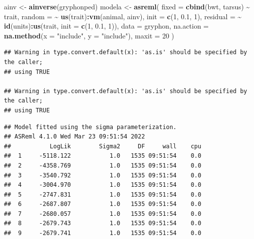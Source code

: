 \documentclass[
  12pt,
]{book}
\newenvironment{Shaded}{\begin{snugshade}}{\end{snugshade}}
\newcommand{\DataTypeTok}[1]{\textcolor[rgb]{0.13,0.29,0.53}{#1}}
\newcommand{\DecValTok}[1]{\textcolor[rgb]{0.00,0.00,0.81}{#1}}
\newcommand{\FloatTok}[1]{\textcolor[rgb]{0.00,0.00,0.81}{#1}}
\newcommand{\KeywordTok}[1]{\textcolor[rgb]{0.13,0.29,0.53}{\textbf{#1}}}
\newcommand{\NormalTok}[1]{#1}
\newcommand{\OperatorTok}[1]{\textcolor[rgb]{0.81,0.36,0.00}{\textbf{#1}}}
\newcommand{\StringTok}[1]{\textcolor[rgb]{0.31,0.60,0.02}{#1}}
\begin{document}
\begin{Shaded}
\begin{Highlighting}[]
\NormalTok{ainv \textless{}{-}}\StringTok{ }\KeywordTok{ainverse}\NormalTok{(gryphonped)}
\NormalTok{modela \textless{}{-}}\StringTok{ }\KeywordTok{asreml}\NormalTok{(}
  \DataTypeTok{fixed =} \KeywordTok{cbind}\NormalTok{(bwt, tarsus) }\OperatorTok{\textasciitilde{}}\StringTok{ }\NormalTok{trait,}
  \DataTypeTok{random =} \OperatorTok{\textasciitilde{}}\StringTok{ }\KeywordTok{us}\NormalTok{(trait)}\OperatorTok{:}\KeywordTok{vm}\NormalTok{(animal, ainv), }\DataTypeTok{init =} \KeywordTok{c}\NormalTok{(}\DecValTok{1}\NormalTok{, }\FloatTok{0.1}\NormalTok{, }\DecValTok{1}\NormalTok{),}
  \DataTypeTok{residual =} \OperatorTok{\textasciitilde{}}\StringTok{ }\KeywordTok{id}\NormalTok{(units)}\OperatorTok{:}\KeywordTok{us}\NormalTok{(trait, }\DataTypeTok{init =} \KeywordTok{c}\NormalTok{(}\DecValTok{1}\NormalTok{, }\FloatTok{0.1}\NormalTok{, }\DecValTok{1}\NormalTok{)),}
  \DataTypeTok{data =}\NormalTok{ gryphon,}
  \DataTypeTok{na.action =} \KeywordTok{na.method}\NormalTok{(}\DataTypeTok{x =} \StringTok{"include"}\NormalTok{, }\DataTypeTok{y =} \StringTok{"include"}\NormalTok{),}
  \DataTypeTok{maxit =} \DecValTok{20}
\NormalTok{)}
\end{Highlighting}
\end{Shaded}

\begin{verbatim}
## Warning in type.convert.default(x): 'as.is' should be specified by the caller;
## using TRUE

## Warning in type.convert.default(x): 'as.is' should be specified by the caller;
## using TRUE
\end{verbatim}

\begin{verbatim}
## Model fitted using the sigma parameterization.
## ASReml 4.1.0 Wed Mar 23 09:51:54 2022
##           LogLik        Sigma2     DF     wall    cpu
##  1     -5118.122           1.0   1535 09:51:54    0.0
##  2     -4358.769           1.0   1535 09:51:54    0.0
##  3     -3540.792           1.0   1535 09:51:54    0.0
##  4     -3004.970           1.0   1535 09:51:54    0.0
##  5     -2747.831           1.0   1535 09:51:54    0.0
##  6     -2687.807           1.0   1535 09:51:54    0.0
##  7     -2680.057           1.0   1535 09:51:54    0.0
##  8     -2679.743           1.0   1535 09:51:54    0.0
##  9     -2679.741           1.0   1535 09:51:54    0.0
\end{verbatim}
\end{document}
